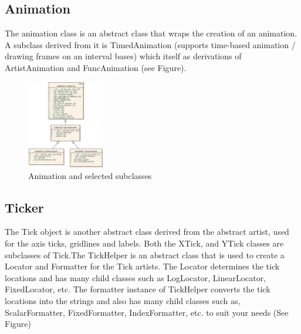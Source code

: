 \documentclass[pdftex,10pt,a4paper]{report}
\begin{document}
\subsection{Animation}
The animation class is an abstract class that wraps the creation of an animation. A subclass derived from it is TimedAnimation (supports time-based animation / drawing frames on an interval bases) which itself as derivations of ArtistAnimation and FuncAnimation (see Figure).

\begin{figure}[ht!]
        \centering
                \includegraphics[width=0.3\textwidth]{img/umls/pi/animation}
        \caption{Animation and selected subclasses}\label{fig:artistExAgg}
\end{figure}

\subsection{Ticker}
The Tick object is another abstract class derived from the abstract artist, used for the axis ticks, gridlines and labels. Both the XTick, and YTick classes are subclasses of Tick.The TickHelper is an abstract class that is used to create a Locator and Formatter for the Tick artists. The Locator determines the tick locations and has many child classes such as LogLocator, LinearLocator, FixedLocator, etc.  The formatter instance of TickHelper converts the tick locations into the strings and also has many child classes such as, ScalarFormatter, FixedFormatter, IndexFormatter, etc. to suit your needs (See Figure)
\end{document}
